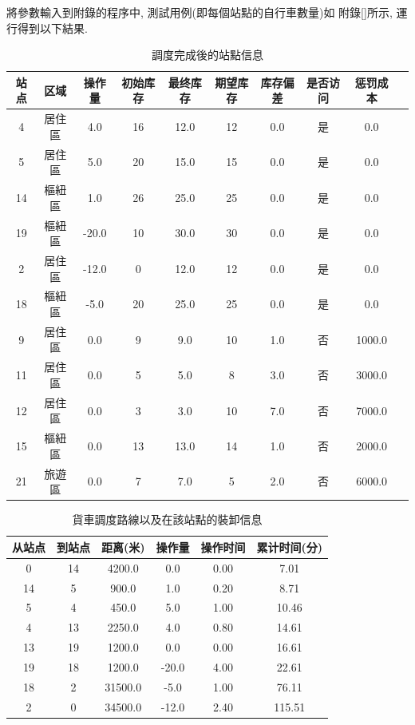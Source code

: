 將參數輸入到{\color{red}\Large 附錄}的程序中, 測試用例(即每個站點的自行車數量)如{\color{red} \Large 附錄[]所示}, 運行得到以下結果. 
\begin{table}[H]
    \begin{center}
        \begin{tabular}{cccccccccc}
            \hline
            站点  & 区域 & 操作量 & 初始库存 & 最终库存 & 期望库存 & 库存偏差 & 是否访问 & 惩罚成本 \\
            \hline
            4  & 居住區 & 4.0 & 16 & 12.0 & 12 & 0.0 & 是 & 0.0 \\
            5  & 居住區 & 5.0 & 20 & 15.0 & 15 & 0.0 & 是 & 0.0 \\
            14  & 樞紐區 & 1.0 & 26 & 25.0 & 25 & 0.0 & 是 & 0.0 \\
            19  & 樞紐區 & -20.0 & 10 & 30.0 & 30 & 0.0 & 是 & 0.0 \\
            2  & 居住區 & -12.0 & 0 & 12.0 & 12 & 0.0 & 是 & 0.0 \\
            18  & 樞紐區 & -5.0 & 20 & 25.0 & 25 & 0.0 & 是 & 0.0 \\
            9  & 居住區 & 0.0 & 9 & 9.0 & 10 & 1.0 & 否 & 1000.0 \\
            11  & 居住區 & 0.0 & 5 & 5.0 & 8 & 3.0 & 否 & 3000.0 \\
            12  & 居住區 & 0.0 & 3 & 3.0 & 10 & 7.0 & 否 & 7000.0 \\
            15  & 樞紐區 & 0.0 & 13 & 13.0 & 14 & 1.0 & 否 & 2000.0 \\
            21  & 旅遊區 & 0.0 & 7 & 7.0 & 5 & 2.0 & 否 & 6000.0 \\
            \hline
        \end{tabular}
    \end{center}
    \caption{調度完成後的站點信息}
\end{table}
\begin{table}[H]
    \begin{center}
        \begin{tabular}{cccccc}
            \hline
            从站点 & 到站点 & 距离(米) & 操作量 & 操作时间 & 累计时间(分) \\
            \hline
            0 & 14 & 4200.0 & 0.0 & 0.00 & 7.01 \\
            14 & 5 & 900.0 & 1.0 & 0.20 & 8.71 \\
            5 & 4 & 450.0 & 5.0 & 1.00 & 10.46 \\
            4 & 13 & 2250.0 & 4.0 & 0.80 & 14.61 \\
            13 & 19 & 1200.0 & 0.0 & 0.00 & 16.61 \\
            19 & 18 & 1200.0 & -20.0 & 4.00 & 22.61 \\
            18 & 2 & 31500.0 & -5.0 & 1.00 & 76.11 \\
            2 & 0 & 34500.0 & -12.0 & 2.40 & 115.51 \\
            \hline
        \end{tabular}
    \end{center}
    \caption{貨車調度路線以及在該站點的裝卸信息}
\end{table}

